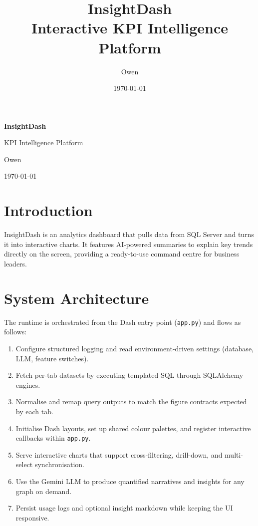 \documentclass[12pt,a4paper]{article}
\title{\bfseries InsightDash \\ \large Interactive KPI Intelligence Platform}
\author{Owen}
\date{\today}
\begin{document}
\begin{titlepage}
    \centering
    \vspace*{\fill}
    {\bfseries\Huge InsightDash \par}
    \vspace{0.5cm}
    {\Large KPI Intelligence Platform \par}
    \vspace{1.5cm}
    {\large Owen \par}
    \vspace{0.5cm}
    {\large \today \par}
    \vspace*{\fill}
\end{titlepage}

\tableofcontents{}
\newpage

\section{Introduction}

\begin{flushleft}
InsightDash is an analytics dashboard that pulls data from SQL Server and turns it into interactive charts. It features AI-powered summaries to explain key trends directly on the screen, providing a ready-to-use command centre for business leaders.
\end{flushleft}

\section{System Architecture}

The runtime is orchestrated from the Dash entry point (\texttt{app.py}) and flows as follows:

\begin{enumerate}
    \item Configure structured logging and read environment-driven settings (database, LLM, feature switches).
    \item Fetch per-tab datasets by executing templated SQL through SQLAlchemy engines.
    \item Normalise and remap query outputs to match the figure contracts expected by each tab.
    \item Initialise Dash layouts, set up shared colour palettes, and register interactive callbacks within \texttt{app.py}.
    \item Serve interactive charts that support cross-filtering, drill-down, and multi-select synchronisation.
    \item Use the Gemini LLM to produce quantified narratives and insights for any graph on demand.
    \item Persist usage logs and optional insight markdown while keeping the UI responsive.
\end{enumerate}
\end{document}
